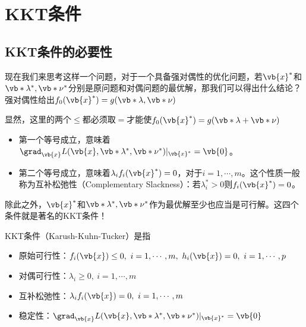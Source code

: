 \section{KKT条件}

\subsection{KKT条件的必要性}

现在我们来思考这样一个问题，对于一个具备强对偶性的优化问题，若$\vb{x}^{*}$和$\vb*{\lambda}^{*},\vb*{\nu}^{*}$分别是原问题和对偶问题的最优解，那我们可以得出什么结论？强对偶性给出$f_0(\vb{x}^{*})=g(\vb*{\lambda},\vb*{\nu})$

显然，这里的两个$\leq$都必须取$=$才能使$f_0(\vb{x}^{*})=g(\vb*{\lambda}+\vb*{\nu})$
\begin{itemize}
    \item 第一个等号成立，意味着$\grad_{\vb{x}}L(\vb{x},\vb*{\lambda}^{*},\vb*{\nu}^{*})|_{\vb{x}^{*}}=\vb{0}$。
    \item 第二个等号成立，意味着$\lambda_i f_i(\vb{x}^{*})=0$，对于$i=1,\cdots,m$。这个性质一般称为互补松弛性（Complementary Slackness）：若$\lambda_i^{*}>0$则$f_i(\vb{x}^{*})=0$。
\end{itemize}

除此之外，$\vb{x}^{*}$和$\vb*{\lambda}^{*},\vb*{\nu}^{*}$作为最优解至少也应当是可行解。这四个条件就是著名的KKT条件！

\begin{BoxDefinition}[KKT条件]
    KKT条件（Karush-Kuhn-Tucker）是指
    \begin{itemize}
        \item 原始可行性：$f_i(\vb{x})\leq 0,\ i=1,\cdots,m,\ h_i(\vb{x})=0,\ i=1,\cdots,p$
        \item 对偶可行性：$\lambda_i\geq 0,\ i=1,\cdots,m$
        \item 互补松弛性：$\lambda_if_i(\vb{x})=0,\ i=1,\cdots,m$
        \item 稳定性：$\grad_{\vb{x}}L(\vb{x},\vb*{\lambda}^{*},\vb*{\nu}^{*})|_{\vb{x}^{*}}=\vb{0}$
    \end{itemize}
\end{BoxDefinition}

